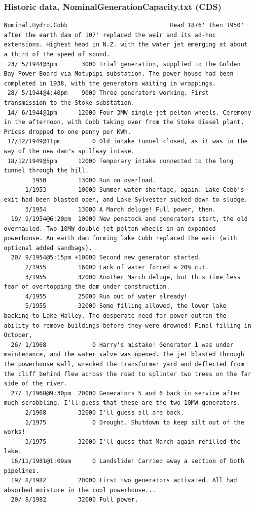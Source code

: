 \documentclass[aspectratio=169]{beamer}
\begin{document}
\begin{frame}[fragile]
  \frametitle{Historic data, NominalGenerationCapacity.txt (CDS)}
  \vspace{-0.5mm}
  \scriptsize
  \begin{verbatim}
Nominal.Hydro.Cobb                             Head 1876' then 1950' after the earth dam of 107' replaced the weir and its ad-hoc extensions. Highest head in N.Z. with the water jet emerging at about a third of the speed of sound.
 23/ 5/1944@3pm       3000 Trial generation, supplied to the Golden Bay Power Board via Motupipi substation. The power house had been completed in 1938, with the generators waiting in wrappings.
 28/ 5/1944@4:40pm    9000 Three generators working. First transmission to the Stoke substation.
 14/ 6/1944@1pm      12000 Four 3MW single-jet pelton wheels. Ceremony in the afternoon, with Cobb taking over from the Stoke diesel plant. Prices dropped to one penny per KWh.
 17/12/1949@11pm         0 Old intake tunnel closed, as it was in the way of the new dam's spillway intake.
 18/12/1949@5pm      12000 Temporary intake connected to the long tunnel through the hill.
        1950         13000 Run on overload.
      1/1953         10000 Summer water shortage, again. Lake Cobb's exit had been blasted open, and Lake Sylvester sucked down to sludge.
      3/1954         13000 A March deluge! Full power, then.
  19/ 9/1954@6:20pm  10000 New penstock and generators start, the old overhauled. Two 10MW double-jet pelton wheels in an expanded powerhouse. An earth dam forming lake Cobb replaced the weir (with optional added sandbags).
  20/ 9/1954@5:15pm +10000 Second new generator started.
      2/1955         16000 Lack of water forced a 20% cut.
      3/1955         32000 Another March deluge, but this time less fear of overtopping the dam under construction.
      4/1955         25000 Run out of water already!
      5/1955         32000 Some filling allowed, the lower lake backing to Lake Halley. The desperate need for power outran the ability to remove buildings before they were drowned! Final filling in October,
  26/ 1/1968             0 Harry's mistake! Generator 1 was under maintenance, and the water valve was opened. The jet blasted through the powerhouse wall, wrecked the transformer yard and deflected from the cliff behind flew across the road to splinter two trees on the far side of the river.
  27/ 1/1968@9:30pm  20000 Generators 5 and 6 back in service after much scrabbling. I'll guess that these are the two 10MW generators.
      2/1968         32000 I'll guess all are back.
      1/1975             0 Drought. Shutdown to keep silt out of the works!
      3/1975         32000 I'll guess that March again refilled the lake.
  16/11/1981@1:09am      0 Landslide! Carried away a section of both pipelines.
  19/ 8/1982         20000 First two generators activated. All had absorbed moisture in the cool powerhouse...
  20/ 8/1982         32000 Full power.

  \end{verbatim}
\end{frame}
\end{document}
